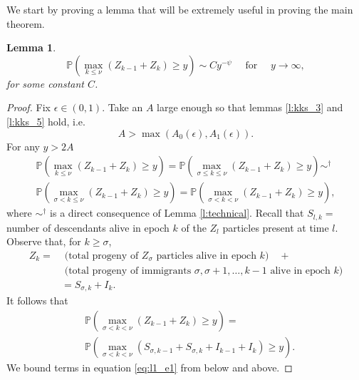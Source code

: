 \documentclass[12pt]{article}
\newcommand{\Pro}{\mathbb{P}}
\newcommand*\Proo[1]{\Pro \left( #1 \right) }
\newtheorem{lemma}[theorem]{Lemma}
\begin{document}
We start by proving a lemma that will be extremely useful in proving the main theorem. 

\begin{lemma} \label{l:1}
\begin{equation*}
\Proo{\max_{k\leq \nu} (Z_{k-1} + Z_k) \geq y }  \sim C y^{-\psi}  \quad \text{ for } \quad  y \rightarrow \infty,
\end{equation*}
for some constant $C$.
\end{lemma}

\begin{proof}
Fix $\epsilon  \in (0, 1)$. Take an $A$ large enough so that lemmas \ref{l:kks_3} and \ref{l:kks_5} hold, i.e. $$
A > \max(A_0(\epsilon), A_1(\epsilon)).
$$
For any $y > 2A$
\begin{equation}\label{eq:l1_e1}
\begin{aligned}
    \Proo{\max_{k\leq \nu} (Z_{k-1} + Z_k) \geq y } = 
    \Proo{\max_{\sigma \leq k\leq \nu} (Z_{k-1} + Z_k) \geq y } \sim^{\dagger} \\ \Proo{\max_{\sigma < k\leq \nu} (Z_{k-1} + Z_k) \geq y } = \Proo{\max_{\sigma < k < \nu} (Z_{k-1} + Z_k) \geq y },
\end{aligned}
\end{equation}
where $\sim^{\dagger}$ is a direct consequence of Lemma \ref{l:technical}. Recall that $S_{l,k} = $ number of descendants alive in epoch $k$ of the $Z_l$ particles present at time $l$. Observe that, for $k \geq \sigma$,
\begin{equation*}
\begin{aligned}
    Z_k = &\text{ (total progeny of } Z_\sigma \text{ particles alive in epoch } k) \quad + \\
        &\text{ (total progeny of immigrants } \sigma, \sigma+1, \dots, k-1 \text{ alive in epoch } k)  \\
        &=S_{\sigma, k} + I_k.
\end{aligned}
\end{equation*}
It follows that 
\begin{equation} \label{eq:l1_5}
\begin{aligned}
    &\Proo{\max_{\sigma < k < \nu} (Z_{k-1} + Z_k) \geq y } = \\
    &\Proo{\max_{\sigma < k < \nu} (S_{\sigma, k-1} + S_{\sigma, k} + I_{k-1} + I_k) \geq y }.
\end{aligned}
\end{equation}
We bound terms in equation \eqref{eq:l1_e1} from below and above. 


\end{proof}
\end{document}
